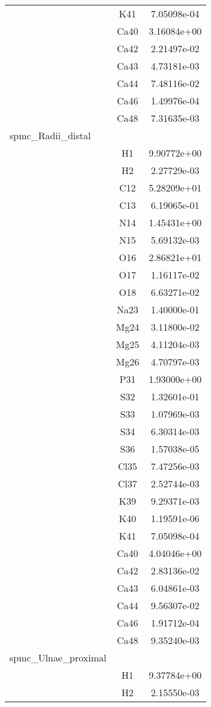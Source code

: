 \begin{centering}
\begin{longtable}{l c c}
& K41 & 7.05098e-04 \\ 
& Ca40 & 3.16084e+00 \\ 
& Ca42 & 2.21497e-02 \\ 
& Ca43 & 4.73181e-03 \\ 
& Ca44 & 7.48116e-02 \\ 
& Ca46 & 1.49976e-04 \\ 
& Ca48 & 7.31635e-03 \\ 
\hline
spmc_Radii_distal & & \\
\hline
& H1 & 9.90772e+00 \\ 
& H2 & 2.27729e-03 \\ 
& C12 & 5.28209e+01 \\ 
& C13 & 6.19065e-01 \\ 
& N14 & 1.45431e+00 \\ 
& N15 & 5.69132e-03 \\ 
& O16 & 2.86821e+01 \\ 
& O17 & 1.16117e-02 \\ 
& O18 & 6.63271e-02 \\ 
& Na23 & 1.40000e-01 \\ 
& Mg24 & 3.11800e-02 \\ 
& Mg25 & 4.11204e-03 \\ 
& Mg26 & 4.70797e-03 \\ 
& P31 & 1.93000e+00 \\ 
& S32 & 1.32601e-01 \\ 
& S33 & 1.07969e-03 \\ 
& S34 & 6.30314e-03 \\ 
& S36 & 1.57038e-05 \\ 
& Cl35 & 7.47256e-03 \\ 
& Cl37 & 2.52744e-03 \\ 
& K39 & 9.29371e-03 \\ 
& K40 & 1.19591e-06 \\ 
& K41 & 7.05098e-04 \\ 
& Ca40 & 4.04046e+00 \\ 
& Ca42 & 2.83136e-02 \\ 
& Ca43 & 6.04861e-03 \\ 
& Ca44 & 9.56307e-02 \\ 
& Ca46 & 1.91712e-04 \\ 
& Ca48 & 9.35240e-03 \\ 
\hline
spmc_Ulnae_proximal & & \\
\hline
& H1 & 9.37784e+00 \\ 
& H2 & 2.15550e-03 \\ 

\end{longtable}
\end{centering}
